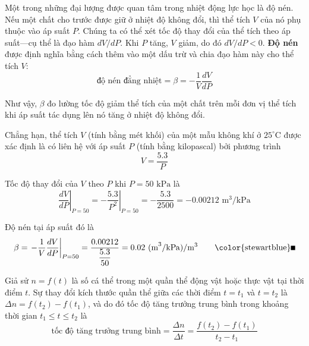 \quad Một trong những đại lượng được quan tâm trong nhiệt động lực học là độ nén. Nếu một chất cho trước được giữ ở nhiệt độ không đổi, thì thể tích $V$ của nó phụ thuộc vào áp suất $P$. Chúng ta có thể xét tốc độ thay đổi của thể tích theo áp suất---cụ thể là đạo hàm $dV/dP$. Khi $P$ tăng, $V$ giảm, do đó $dV/dP < 0$. \textbf{Độ nén} được định nghĩa bằng cách thêm vào một dấu trừ và chia đạo hàm này cho thể tích $V$:
\begin{equation*}
\text{độ nén đẳng nhiệt} = \beta = -\frac{1}{V} \frac{dV}{dP}
\end{equation*}

Như vậy, $\beta$ đo lường tốc độ giảm thể tích của một chất trên mỗi đơn vị thể tích khi áp suất tác dụng lên nó tăng ở nhiệt độ không đổi.

Chẳng hạn, thể tích $V$ (tính bằng mét khối) của một mẫu không khí ở $25^\circ\text{C}$ được xác định là có liên hệ với áp suất $P$ (tính bằng kilopascal) bởi phương trình
\begin{equation*}
V = \frac{5.3}{P}
\end{equation*}

Tốc độ thay đổi của $V$ theo $P$ khi $P = 50\text{ kPa}$ là
\begin{equation*}
\left. \frac{dV}{dP} \right|_{P=50} = \left. -\frac{5.3}{P^2} \right|_{P=50} = -\frac{5.3}{2500} = -0.00212\text{ m}^3/\text{kPa}
\end{equation*}

Độ nén tại áp suất đó là
\begin{equation*}
\beta = \left. -\frac{1}{V} \frac{dV}{dP} \right|_{P=50} = \frac{0.00212}{\dfrac{5.3}{50}} = 0.02\text{ (m}^3/\text{kPa)}/\text{m}^3 \tag*{{\color{stewartblue}\rule{1.2ex}{1.2ex}}}
\end{equation*}

\vspace{1.8em}

\noindent{\color{stewartblue}\rule{1.2ex}{1.2ex}}\hspace{0.6em}{\sffamily\bfseries\large Sinh học}

\vspace{0.8em}

\quad Giả sử $n = f(t)$ là số cá thể trong một quần thể động vật hoặc thực vật tại thời điểm $t$. Sự thay đổi kích thước quần thể giữa các thời điểm $t = t_1$ và $t = t_2$ là $\Delta n = f(t_2) - f(t_1)$, và do đó tốc độ tăng trưởng trung bình trong khoảng thời gian $t_1 \leqslant t \leqslant t_2$ là
\begin{equation*}
\text{tốc độ tăng trưởng trung bình} = \frac{\Delta n}{\Delta t} = \frac{f(t_2) - f(t_1)}{t_2 - t_1}
\end{equation*}

